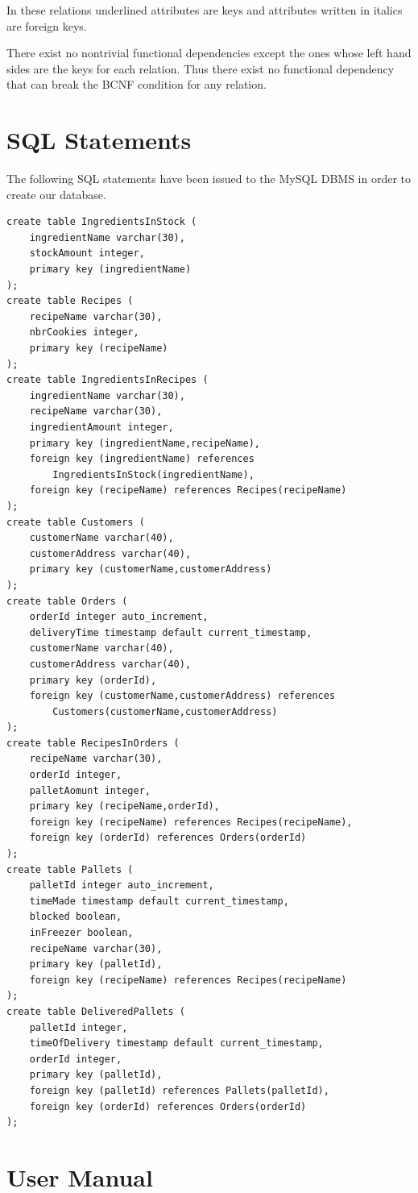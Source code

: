 \documentclass[a4paper]{article}
\begin{document}
\vspace{0.5cm}
\noindent In these relations underlined attributes are keys and attributes written in italics are foreign keys.

There exist no nontrivial functional dependencies except the ones whose left hand sides are the keys for each relation. Thus there exist no functional dependency that can break the BCNF condition for any relation.

\section{SQL Statements}
The following SQL statements have been issued to the MySQL DBMS in order to create our database.
\begin{Verbatim}
create table IngredientsInStock (
	ingredientName varchar(30),
	stockAmount integer,
	primary key (ingredientName)
);
create table Recipes (
	recipeName varchar(30),
	nbrCookies integer,
	primary key (recipeName)
);
create table IngredientsInRecipes (
	ingredientName varchar(30),
	recipeName varchar(30),
	ingredientAmount integer,
	primary key (ingredientName,recipeName),
	foreign key (ingredientName) references 
		IngredientsInStock(ingredientName),
	foreign key (recipeName) references Recipes(recipeName)
);
create table Customers (
	customerName varchar(40),
	customerAddress varchar(40),
	primary key (customerName,customerAddress)
);
create table Orders (
	orderId integer auto_increment,
	deliveryTime timestamp default current_timestamp,
	customerName varchar(40),
	customerAddress varchar(40),
	primary key (orderId),
	foreign key (customerName,customerAddress) references 
		Customers(customerName,customerAddress)
);
create table RecipesInOrders (
	recipeName varchar(30),
	orderId integer,
	palletAomunt integer,
	primary key (recipeName,orderId),
	foreign key (recipeName) references Recipes(recipeName),
	foreign key (orderId) references Orders(orderId)
);
create table Pallets (
	palletId integer auto_increment,
	timeMade timestamp default current_timestamp,
	blocked boolean,
	inFreezer boolean,
	recipeName varchar(30),
	primary key (palletId),
	foreign key (recipeName) references Recipes(recipeName)
);
create table DeliveredPallets (
	palletId integer,
	timeOfDelivery timestamp default current_timestamp,
	orderId integer,
	primary key (palletId),
	foreign key (palletId) references Pallets(palletId),
	foreign key (orderId) references Orders(orderId)
);
\end{Verbatim}

\section{User Manual}
\end{document}
